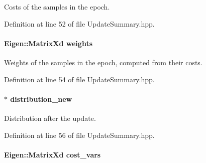 Costs of the samples in the epoch. 



Definition at line 52 of file Update\+Summary.\+hpp.

\hypertarget{classDmpBbo_1_1UpdateSummary_a16d226260adc0af72c89783c656d25d5}{
\paragraph[{weights}]{\setlength{\rightskip}{0pt plus 5cm}Eigen\+::\+Matrix\+Xd weights}}\label{classDmpBbo_1_1UpdateSummary_a16d226260adc0af72c89783c656d25d5}


Weights of the samples in the epoch, computed from their costs. 



Definition at line 54 of file Update\+Summary.\+hpp.

\hypertarget{classDmpBbo_1_1UpdateSummary_a85f1c35f510f89864f15029ea16e168c}{
\paragraph[{distribution\+\_\+new}]{$\ast$ distribution\+\_\+new}}\label{classDmpBbo_1_1UpdateSummary_a85f1c35f510f89864f15029ea16e168c}


Distribution after the update. 



Definition at line 56 of file Update\+Summary.\+hpp.

\hypertarget{classDmpBbo_1_1UpdateSummary_ab6057150915c96b1d20ed485a1f5ce18}{
\paragraph[{cost\+\_\+vars}]{\setlength{\rightskip}{0pt plus 5cm}Eigen\+::\+Matrix\+Xd cost\+\_\+vars}}\label{classDmpBbo_1_1UpdateSummary_ab6057150915c96b1d20ed485a1f5ce18}


